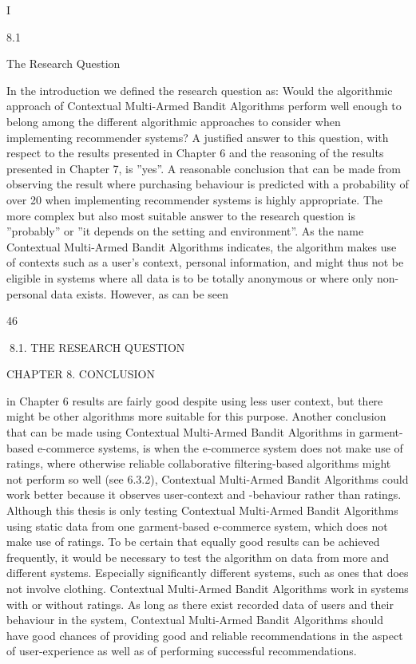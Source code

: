 I

8.1

The Research Question

In the introduction we defined the research question as:
Would the algorithmic approach of Contextual Multi-Armed Bandit Algorithms perform
well enough to belong among the different algorithmic approaches to consider when implementing recommender systems?
A justified answer to this question, with respect to the results presented in Chapter 6 and
the reasoning of the results presented in Chapter 7, is ”yes”. A reasonable conclusion that
can be made from observing the result where purchasing behaviour is predicted with a
probability of over 20 %
when implementing recommender systems is highly appropriate.
The more complex but also most suitable answer to the research question is ”probably”
or ”it depends on the setting and environment”. As the name Contextual Multi-Armed
Bandit Algorithms indicates, the algorithm makes use of contexts such as a user’s context, personal information, and might thus not be eligible in systems where all data is to
be totally anonymous or where only non-personal data exists. However, as can be seen

46

8.1. THE RESEARCH QUESTION

CHAPTER 8. CONCLUSION

in Chapter 6 results are fairly good despite using less user context, but there might be
other algorithms more suitable for this purpose.
Another conclusion that can be made using Contextual Multi-Armed Bandit Algorithms
in garment-based e-commerce systems, is when the e-commerce system does not make
use of ratings, where otherwise reliable collaborative filtering-based algorithms might
not perform so well (see 6.3.2), Contextual Multi-Armed Bandit Algorithms could work
better because it observes user-context and -behaviour rather than ratings. Although
this thesis is only testing Contextual Multi-Armed Bandit Algorithms using static data
from one garment-based e-commerce system, which does not make use of ratings. To
be certain that equally good results can be achieved frequently, it would be necessary
to test the algorithm on data from more and different systems. Especially significantly
different systems, such as ones that does not involve clothing.
Contextual Multi-Armed Bandit Algorithms work in systems with or without ratings.
As long as there exist recorded data of users and their behaviour in the system, Contextual Multi-Armed Bandit Algorithms should have good chances of providing good
and reliable recommendations in the aspect of user-experience as well as of performing
successful recommendations.





